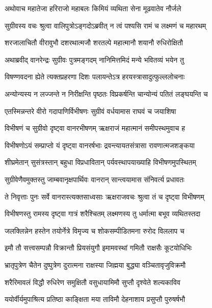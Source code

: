 
\twolineshloka
{अथोवाच महातेजा हरिराजो महाबलः}
{किमियं व्यथिता सेना मूढवातेव नौर्जले} %

\twolineshloka
{सुग्रीवस्य वचः श्रुत्वा वालिपुत्रोऽङ्गदोऽब्रवीत्}
{न त्वं पश्यसि रामं च लक्ष्मणं च महारथम्} %

\twolineshloka
{शरजालाचितौ वीरावुभौ दशरथात्मजौ}
{शरतल्पे महात्मानौ शयानौ रुधिरोक्षितौ} %

\twolineshloka
{अथाब्रवीद् वानरेन्द्रः सुग्रीवः पुत्रमङ्गदम्}
{नानिमित्तमिदं मन्ये भवितव्यं भयेन तु} %

\twolineshloka
{विषण्णवदना ह्येते त्यक्तप्रहरणा दिशः}
{पलायन्तेऽत्र हरयस्त्रासादुत्फुल्ललोचनाः} %

\twolineshloka
{अन्योन्यस्य न लज्जन्ते न निरीक्षन्ति पृष्ठतः}
{विप्रकर्षन्ति चान्योन्यं पतितं लङ्घयन्ति च} %

\twolineshloka
{एतस्मिन्नन्तरे वीरो गदापाणिर्विभीषणः}
{सुग्रीवं वर्धयामास राघवं च जयाशिषा} %

\twolineshloka
{विभीषणं च सुग्रीवो दृष्ट्वा वानरभीषणम्}
{ऋक्षराजं महात्मानं समीपस्थमुवाच ह} %

\twolineshloka
{विभीषणोऽयं सम्प्राप्तो यं दृष्ट्वा वानरर्षभाः}
{द्रवन्त्यायतसंत्रासा रावणात्मजशङ्कया} %

\twolineshloka
{शीघ्रमेतान् सुसंत्रस्तान् बहुधा विप्रधावितान्}
{पर्यवस्थापयाख्याहि विभीषणमुपस्थितम्} %

\twolineshloka
{सुग्रीवेणैवमुक्तस्तु जाम्बवानृक्षपार्थिवः}
{वानरान् सान्त्वयामास संनिवर्त्य प्रधावतः} %

\twolineshloka
{ते निवृत्ताः पुनः सर्वे वानरास्त्यक्तसाध्वसाः}
{ऋक्षराजवचः श्रुत्वा तं च दृष्ट्वा विभीषणम्} %

\twolineshloka
{विभीषणस्तु रामस्य दृष्ट्वा गात्रं शरैश्चितम्}
{लक्ष्मणस्य तु धर्मात्मा बभूव व्यथितस्तदा} %

\twolineshloka
{जलक्लिन्नेन हस्तेन तयोर्नेत्रे विमृज्य च}
{शोकसम्पीडितमना रुरोद विललाप च} %

\twolineshloka
{इमौ तौ सत्त्वसम्पन्नौ विक्रान्तौ प्रियसंयुगौ}
{इमामवस्थां गमितौ राक्षसैः कूटयोधिभिः} %

\twolineshloka
{भ्रातृपुत्रेण चैतेन दुष्पुत्रेण दुरात्मना}
{राक्षस्या जिह्मया बुद्ध्या वञ्चितावृजुविक्रमौ} %

\twolineshloka
{शरैरिमावलं विद्धौ रुधिरेण समुक्षितौ}
{वसुधायामिमौ सुप्तौ दृश्येते शल्यकाविव} %

\twolineshloka
{ययोर्वीर्यमुपाश्रित्य प्रतिष्ठा काङ्क्षिता मया}
{ताविमौ देहनाशाय प्रसुप्तौ पुरुषर्षभौ} %

